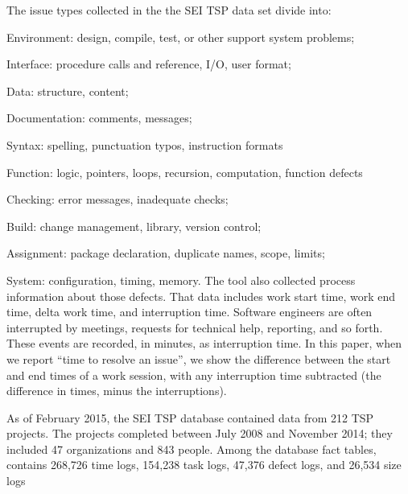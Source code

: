 The issue types collected in the the SEI TSP data set divide into:
\be 
\item Environment: design, compile, test, or other support system problems;
\item Interface: procedure calls and reference, I/O, user format;
\item Data: structure, content; 
\item Documentation: comments, messages;
\item Syntax: spelling, punctuation typos, instruction formats
\item Function: logic, pointers, loops, recursion, computation, function defects  
\item Checking: error messages, inadequate checks;
\item Build: change management, library, version control;
\item Assignment: package
declaration, duplicate names, scope, limits;
\item System: configuration, timing, memory.
\ee
The tool also collected process information about those defects.
That data includes  work start time, work end time, delta
work time, and interruption time. Software engineers are often
interrupted by meetings, requests for technical help, reporting, and
so forth. These events are recorded, in minutes, as interruption
time. In this paper, when we report ``time to resolve an
issue'', we show the difference between the start and end times
of a work session, with any interruption time subtracted (the
difference in times, minus the interruptions).  



As of February 2015, the SEI TSP database contained data from 212
TSP projects. The projects completed between July 2008 and
November 2014; they included 47 organizations and 843 people. Among
the database fact tables, 
contains 268,726 time logs, 
154,238 task logs,
 47,376 defect logs, 
and 26,534 size logs


%
 
